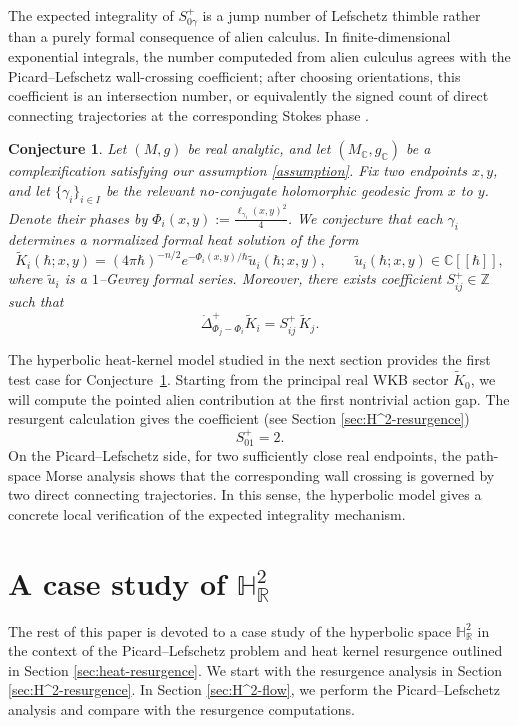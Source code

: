 \documentclass[11pt]{amsart}
\theoremstyle{plain}
\newtheorem{conj}[thm]{Conjecture}
\theoremstyle{definition}
\newcommand{\R}{\mathbb{R}}
\newcommand{\C}{\mathbb{C}}
\newcommand{\Z}{\mathbb Z}
\begin{document}
The expected integrality of $S_{0\gamma}^{+}$ is a jump number of Lefschetz thimble rather than a purely formal consequence of alien calculus.  In
finite-dimensional exponential integrals, the number computeded from alien culculus agrees with the Picard--Lefschetz wall-crossing coefficient; after
choosing orientations, this coefficient is an intersection number, or
equivalently the signed count of direct connecting trajectories at the
corresponding Stokes phase \cite{LiLiTang2026}. 

\begin{conj}
\label{conj:alien-PL-integrality-heat}
Let $(M,g)$ be real analytic, and let $(M_{\C},g_{\C})$ be a
complexification satisfying our assumption \ref{assumption}.  Fix two endpoints $x,y$, and let
$\{\gamma_i\}_{i\in I}$ be the relevant no-conjugate holomorphic geodesic from $x$ to $y$.  Denote their phases by $\Phi_i(x,y):=\frac{\ell_{\gamma_i}(x,y)^2}{4}$. We conjecture that each $\gamma_i$ determines a normalized formal heat
solution of the form
\[
\widetilde K_i(\hbar;x,y)
=
(4\pi\hbar)^{-n/2}
e^{-\Phi_i(x,y)/\hbar}
\widetilde u_i(\hbar;x,y),
\qquad
\widetilde u_i(\hbar;x,y)\in \C[[\hbar]],
\]
where $\widetilde u_i$ is a $1$--Gevrey formal series. Moreover, there exists coefficient $S_{ij}^{+}\in\Z$ such that
\[
\dot\Delta_{\Phi_j-\Phi_i}^{+}\widetilde K_i
=
S_{ij}^{+}\,\widetilde K_j.
\]
\end{conj}

The hyperbolic heat-kernel model studied in the next section provides the
first test case for Conjecture~\ref{conj:alien-PL-integrality-heat}.  Starting
from the principal real WKB sector $\widetilde K_0$, we will compute the
pointed alien contribution at the first nontrivial action gap.  The
resurgent calculation gives the coefficient (see Section \ref{sec:H^2-resurgence})
\[
S_{01}^{+}=2.
\]
On the Picard--Lefschetz side, for two sufficiently close real endpoints, the
path-space Morse analysis shows that the corresponding wall crossing is
governed by two direct connecting trajectories.  In this sense, the
hyperbolic model gives a concrete local verification of the expected
integrality mechanism.




\part{A case study of $\mathbb{H}_{\R}^2$ }

The rest of this paper is devoted to a case study of  the hyperbolic space $\mathbb{H}_{\R}^2$ in the context of the Picard–Lefschetz problem and heat kernel resurgence outlined in Section \ref{sec:heat-resurgence}. We start with the resurgence analysis in Section \ref{sec:H^2-resurgence}. In Section \ref{sec:H^2-flow}, we perform the Picard–Lefschetz analysis and compare with the resurgence computations. 
\end{document}
